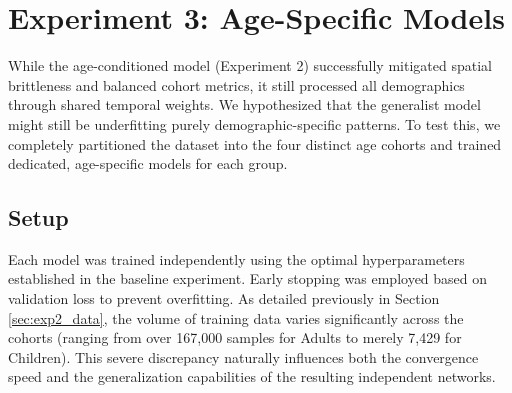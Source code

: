\begin{table}[ht]
\centering
\caption{Performance breakdown by age group for the Age-Conditioned Model (Experiment 2). Results are shown for full 6 channels, 3 channels (robustness test), and natively trained 3 channels.}
\label{tab:exp2_age_group_results}
\end{table}

\FloatBarrier
\section{Experiment 3: Age-Specific Models}
While the age-conditioned model (Experiment 2) successfully mitigated spatial brittleness and balanced cohort metrics, it still processed all demographics through shared temporal weights. We hypothesized that the generalist model might still be underfitting purely demographic-specific patterns. To test this, we completely partitioned the dataset into the four distinct age cohorts and trained dedicated, age-specific models for each group. 

\subsection{Setup}
Each model was trained independently using the optimal hyperparameters established in the baseline experiment. Early stopping was employed based on validation loss to prevent overfitting. As detailed previously in Section \ref{sec:exp2_data}, the volume of training data varies significantly across the cohorts (ranging from over 167,000 samples for Adults to merely 7,429 for Children). This severe discrepancy naturally influences both the convergence speed and the generalization capabilities of the resulting independent networks.

